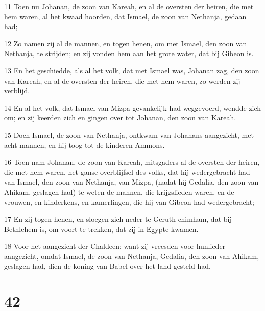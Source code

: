\par 11 Toen nu Johanan, de zoon van Kareah, en al de oversten der heiren, die met hem waren, al het kwaad hoorden, dat Ismael, de zoon van Nethanja, gedaan had;
\par 12 Zo namen zij al de mannen, en togen henen, om met Ismael, den zoon van Nethanja, te strijden; en zij vonden hem aan het grote water, dat bij Gibeon is.
\par 13 En het geschiedde, als al het volk, dat met Ismael was, Johanan zag, den zoon van Kareah, en al de oversten der heiren, die met hem waren, zo werden zij verblijd.
\par 14 En al het volk, dat Ismael van Mizpa gevankelijk had weggevoerd, wendde zich om; en zij keerden zich en gingen over tot Johanan, den zoon van Kareah.
\par 15 Doch Ismael, de zoon van Nethanja, ontkwam van Johanans aangezicht, met acht mannen, en hij toog tot de kinderen Ammons.
\par 16 Toen nam Johanan, de zoon van Kareah, mitsgaders al de oversten der heiren, die met hem waren, het ganse overblijfsel des volks, dat hij wedergebracht had van Ismael, den zoon van Nethanja, van Mizpa, (nadat hij Gedalia, den zoon van Ahikam, geslagen had) te weten de mannen, die krijgslieden waren, en de vrouwen, en kinderkens, en kamerlingen, die hij van Gibeon had wedergebracht;
\par 17 En zij togen henen, en sloegen zich neder te Geruth-chimham, dat bij Bethlehem is, om voort te trekken, dat zij in Egypte kwamen.
\par 18 Voor het aangezicht der Chaldeen; want zij vreesden voor hunlieder aangezicht, omdat Ismael, de zoon van Nethanja, Gedalia, den zoon van Ahikam, geslagen had, dien de koning van Babel over het land gesteld had.

\chapter{42}

